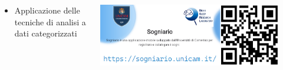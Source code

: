 \begin{minipage}[t]{\textwidth}
    \begin{columns}
        \begin{column}{0.5\textwidth}
        \begin{itemize}
            \item Applicazione delle tecniche di analisi a dati categorizzati
        \end{itemize}
        \end{column}
    \begin{column}{0.5\textwidth}
        \centering
        \includegraphics[width=0.9\textwidth]{immagini/sogniario_QR_2}
        \vspace{0.2cm}
    \end{column}
\end{columns}
\end{minipage}